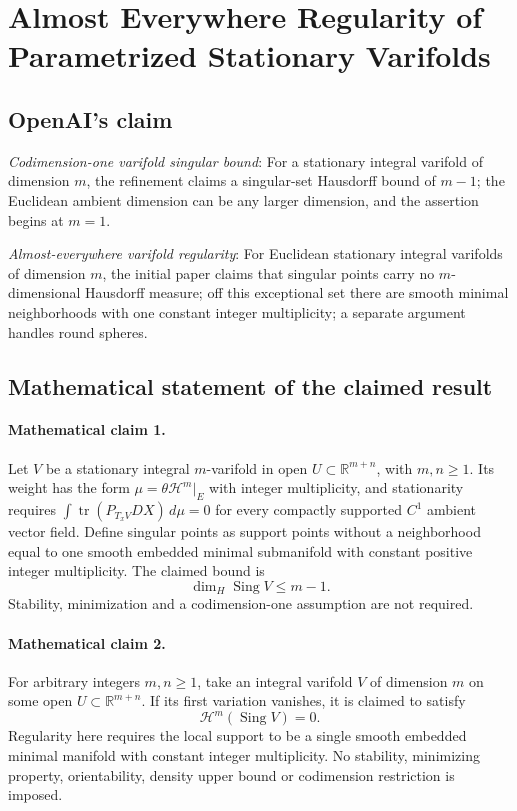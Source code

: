 \documentclass[11pt]{article}
\begin{document}
\section*{Almost Everywhere Regularity of Parametrized Stationary Varifolds}

\subsection{OpenAI's claim}
\textit{Codimension-one varifold singular bound}: For a stationary integral varifold of dimension $m$, the refinement claims a singular-set Hausdorff bound of $m-1$; the Euclidean ambient dimension can be any larger dimension, and the assertion begins at $m=1$.

\textit{Almost-everywhere varifold regularity}: For Euclidean stationary integral varifolds of dimension $m$, the initial paper claims that singular points carry no $m$-dimensional Hausdorff measure; off this exceptional set there are smooth minimal neighborhoods with one constant integer multiplicity; a separate argument handles round spheres.

\subsection{Mathematical statement of the claimed result}
\paragraph{Mathematical claim 1.} Let $V$ be a stationary integral $m$-varifold in open $U\subset\mathbb R^{m+n}$, with $m,n\ge1$. Its weight has the form $\mu=\theta\mathcal H^m|_E$ with integer multiplicity, and stationarity requires $\int\operatorname{tr}(P_{T_xV}DX)\,d\mu=0$ for every compactly supported $C^1$ ambient vector field. Define singular points as support points without a neighborhood equal to one smooth embedded minimal submanifold with constant positive integer multiplicity. The claimed bound is \[\dim_H\operatorname{Sing}V\le m-1.\] Stability, minimization and a codimension-one assumption are not required.

\paragraph{Mathematical claim 2.} For arbitrary integers $m,n\ge1$, take an integral varifold $V$ of dimension $m$ on some open $U\subset\mathbb R^{m+n}$. If its first variation vanishes, it is claimed to satisfy \[\mathcal H^m(\operatorname{Sing}V)=0.\] Regularity here requires the local support to be a single smooth embedded minimal manifold with constant integer multiplicity. No stability, minimizing property, orientability, density upper bound or codimension restriction is imposed.
\end{document}

